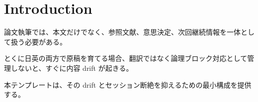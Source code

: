 \section{Introduction}

論文執筆では、本文だけでなく、参照文献、意思決定、次回継続情報を一体として扱う必要がある。

とくに日英の両方で原稿を育てる場合、翻訳ではなく論理ブロック対応として管理しないと、すぐに内容 drift が起きる。

本テンプレートは、その drift とセッション断絶を抑えるための最小構成を提供する。
